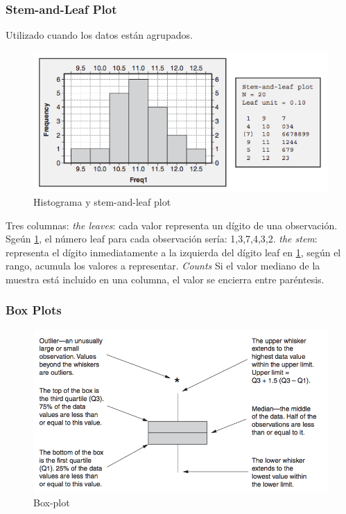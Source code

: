 \documentclass[]{article}
\begin{document}
\subsubsection{Stem-and-Leaf Plot}

Utilizado cuando los datos están agrupados.

\begin{figure}[ht!]
	\centering
	\includegraphics[width=120mm]{imagenes/Histograma.png}
	\caption{Histograma y stem-and-leaf plot}
	\label{fig:Histogramaystemandleafplot}
\end{figure}

Tres columnas: \textit{the leaves}: cada valor representa un dígito de una observación. Sgeún \ref{fig:Histogramaystemandleafplot}, el número leaf para cada observación sería: 1,3,7,4,3,2. \textit{the stem}: representa el dígito inmediatamente a la izquierda del dígito leaf en \ref{fig:Histogramaystemandleafplot}, según el rango, acumula los valores a representar. \textit{Counts} Si el valor mediano de la muestra está incluido en una columna, el valor se encierra entre paréntesis. 

\subsubsection{Box Plots}

\begin{figure}[H]
	\centering
	\includegraphics[width=120mm]{imagenes/Box-plot.png}
	\caption{Box-plot}
	\label{fig:Box-plot}
\end{figure}
\end{document}
